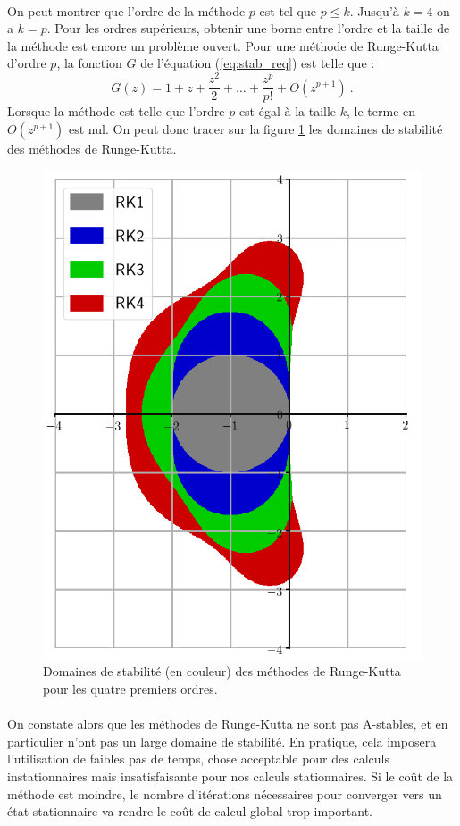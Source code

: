     \paragraph{}
    On peut montrer que l'ordre de la méthode $p$ est tel que $p \leq k$.
    Jusqu'à $k = 4$ on a $k = p$.
    Pour les ordres supérieurs, obtenir une borne entre l'ordre et la taille de la méthode est encore un problème ouvert.
    Pour une méthode de Runge-Kutta d'ordre $p$, la fonction $G$ de l'équation (\ref{eq:stab_req}) est telle que \cite{HairerWanner1996}:
    \[G\left(z\right) = 1 + z + \frac{z^2}{2} + \dots + \frac{z^p}{p!} + O\left(z^{p+1}\right)\ .\]
    Lorsque la méthode est telle que l'ordre $p$ est égal à la taille $k$, le terme en $O\left(z^{p+1}\right)$ est nul.
    On peut donc tracer sur la figure \ref{fig:rk_stab} les domaines de stabilité des méthodes de Runge-Kutta.

    \begin{figure}
      \centering
      \includegraphics[width=.5\textwidth]{images/rk_stab.png}
      \caption{Domaines de stabilité (en couleur) des méthodes de Runge-Kutta pour les quatre premiers ordres.}
      \label{fig:rk_stab}
    \end{figure}

    \paragraph{}
    On constate alors que les méthodes de Runge-Kutta ne sont pas A-stables, et en particulier n'ont pas un large domaine de stabilité.
    En pratique, cela imposera l'utilisation de faibles pas de temps, chose acceptable pour des calculs instationnaires mais insatisfaisante pour nos calculs stationnaires.
    Si le coût de la méthode est moindre, le nombre d'itérations nécessaires pour converger vers un état stationnaire va rendre le coût de calcul global trop important.


